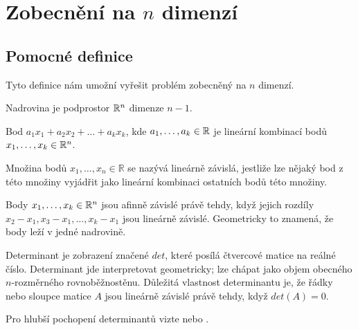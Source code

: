 \chapter{Zobecnění na \texorpdfstring{$n$}{n} dimenzí}
\label{chap:n_dimenzi}
\section{Pomocné definice}
Tyto definice nám umožní vyřešit problém zobecněný na $n$ dimenzí.

\begin{definition}[Nadrovina]
  \label{definice:nadrovina}
  Nadrovina je podprostor $\mathbb{R}^n$ dimenze $n-1$.
\end{definition}

\begin{definition}
  \label{definice:linearni-kombinace}
  Bod $a_1x_1+a_2x_2+\dots+a_kx_k$, kde $a_1, \dots, a_k \in \mathbb{R}$ je lineární kombinací bodů $x_1, \dots, x_k \in \mathbb{R}^n$. \autocite[67]{jindrichbecvarLinearniAlgebra2005}
\end{definition}

\begin{definition}
  \label{definice:linearni-zavislost}
  Množina bodů $x_1, \dots, x_n \in \mathbb{R}$ se nazývá lineárně závislá, jestliže lze nějaký bod z této množiny vyjádřit jako lineární kombinaci ostatních bodů této množiny. \autocite[78]{jindrichbecvarLinearniAlgebra2005}
\end{definition}

\begin{definition}
  \label{definice:afinni-zavislost}
  Body $x_1, \ldots, x_k \in \mathbb{R}^n$ jsou afinně závislé právě tehdy, když jejich rozdíly $x_2-x_1, x_3-x_1, \dots, x_k-x_1$ jsou lineárně závislé. Geometricky to znamená, že body leží v jedné nadrovině.  
\end{definition}

\begin{definition}
  \label{definice:determinant}
  Determinant je zobrazení značené $det$, které posílá čtvercové matice na reálné číslo. Determinant jde interpretovat geometricky; lze chápat jako objem obecného $n$-rozměrného rovnoběžnostěnu. Důležitá vlastnost determinantu je, že řádky nebo sloupce matice $A$ jsou lineárně závislé právě tehdy, když $det(A)=0$. \autocite[224]{danmargalitInteractiveLinearAlgebra2019}

  Pro hlubší pochopení determinantů vizte \autocite[164]{jindrichbecvarLinearniAlgebra2005} nebo \autocite[187]{danmargalitInteractiveLinearAlgebra2019}.
\end{definition}

